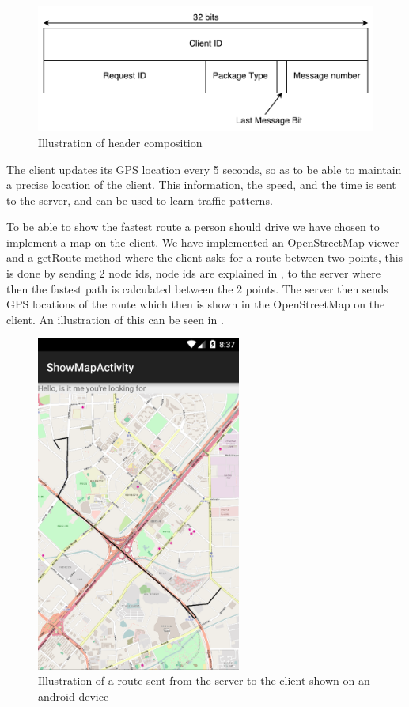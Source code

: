 \begin{figure}[h!]
  \centering
    \includegraphics[width=1\textwidth]{figures/bytesclientserver.pdf}
    \caption{Illustration of header composition}
    \label{fig:bytesclientserver}
\end{figure}

The client updates its GPS location every 5 seconds, so as to be able to maintain a precise location of the client. This information, the speed, and the time is sent to the server, and can be used to learn traffic patterns.

To be able to show the fastest route a person should drive we have chosen to implement a map on the client. We have implemented an OpenStreetMap viewer and a getRoute method where the client asks for a route between two points, this is done by sending 2 node ids, node ids are explained in , to the server where then the fastest path is calculated between the 2 points. The server then sends GPS locations of the route which then is shown in the OpenStreetMap on the client. An illustration of this can be seen in .

\begin{figure}[H]
  \centering
    \includegraphics[width=0.6\textwidth]{figures/routeOnMap.png}
    \caption{Illustration of a route sent from the server to the client shown on an android device}
    \label{fig:routeonmap}
\end{figure}
